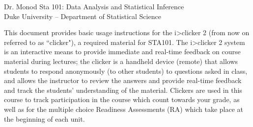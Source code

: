 \documentclass[12pt]{article}
\begin{document}

Dr. Monod \hfill Sta 101: Data Analysis and Statistical Inference \\
Duke University -- Department of Statistical Science \hfill \\


This document provides basic usage instructions for the i>clicker 2 (from now on referred to as ``clicker"), a required material for STA101.  The i>clicker 2 system is an interactive means to provide immediate and real-time feedback on course material during lectures; the clicker is a handheld device (remote) that allows students to respond anonymously (to other students) to questions asked in class, and allows the instructor to review the answers and provide real-time feedback and track the students' understanding of the material.  Clickers are used in this course to track participation in the course which count towards your grade, as well as for the multiple choice Readiness Assessments (RA) which take place at the beginning of each unit.
\end{document}
